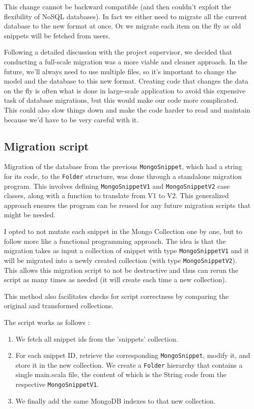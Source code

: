 \documentclass[a4paper,11pt,oneside]{report}
\begin{document}
This change cannot be backward compatible (and then couldn't exploit the flexibility of NoSQL databases). In fact we either need to migrate all the current database to the new format at once. Or we migrate each item on the fly as old snippets will be fetched from users.

Following a detailed discussion with the project supervisor, we decided that conducting a full-scale migration was a more viable and cleaner approach. In the future, we'll always need to use multiple files, so it's important to change the model and the database to this new format. Creating code that changes the data on the fly is often what is done in large-scale application to avoid this expensive task of database migrations, but this would make our code more complicated. This could also slow things down and make the code harder to read and maintain because we'd have to be very careful with it.

\subsection{Migration script}
Migration of the database from the previous \lstinline{MongoSnippet}, which had a string for its code, to the \lstinline{Folder} structure, was done through a standalone migration program. This involves defining \lstinline{MongoSnippetV1} and \lstinline{MongoSnippetV2} case classes, along with a function to translate from V1 to V2. This generalized approach ensures the program can be reused for any future migration scripts that might be needed.

I opted to not mutate each snippet in the Mongo Collection one by one, but to follow more like a functional programming approach. The idea is that the migration takes as input a collection of snippet with type \lstinline{MongoSnippetV1} and it will be migrated into a newly created collection (with type \lstinline{MongoSnippetV2}). This allows this migration script to not be destructive and thus can rerun the script as many times as needed (it will create each time a new collection).

This method also facilitates checks for script correctness by comparing the original and transformed collections.

The script works as follows : 
\begin{enumerate}
\item We fetch all snippet ids from the 'snippets' collection.
\item For each snippet ID, retrieve the corresponding \lstinline{MongoSnippet}, modify it, and store it in the new collection. We create a \lstinline{Folder} hierarchy that contains a single main.scala file, the content of which is the String code from the respective \lstinline{MongoSnippetV1}.
\item We finally add the same MongoDB indexes to that new collection.
\end{enumerate}
\end{document}
